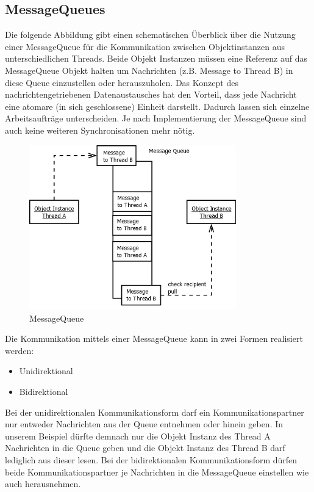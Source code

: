 \documentclass[12pt,oneside,a4paper,bibtotoc,liststotoc]{scrreprt}
\begin{document}
\subsection{MessageQueues}
Die folgende Abbildung gibt einen schematischen Überblick über die Nutzung einer MessageQueue für die Kommunikation zwischen Objektinstanzen aus unterschiedlichen Threads. Beide Objekt Instanzen müssen eine Referenz auf das MessageQueue Objekt halten um Nachrichten (z.B. Message to Thread B) in diese Queue einzustellen oder herauszuholen. Das Konzept des nachrichtengetriebenen Datenaustausches hat den Vorteil, dass jede Nachricht eine atomare (in sich geschlossene) Einheit darstellt. Dadurch lassen sich einzelne Arbeitsaufträge unterscheiden. Je nach Implementierung der MessageQueue sind auch keine weiteren Synchronisationen mehr nötig.
\begin{figure}[H]
  \begin{centering}
    \includegraphics[width=0.8\textwidth]{img/MessageQueue.png}
    \caption{MessageQueue}
    \label{MessageQueue}
  \end{centering}
\end{figure}
Die Kommunikation mittels einer MessageQueue kann in zwei Formen realisiert werden:
\begin{itemize}
\item Unidirektional
\item Bidirektional
\end{itemize}
Bei der unidirektionalen Kommunikationsform darf ein Kommunikationspartner nur entweder Nachrichten aus der Queue entnehmen oder hinein geben. In unserem Beispiel dürfte demnach nur die Objekt Instanz des Thread A Nachrichten in die Queue geben und die Objekt Instanz des Thread B darf lediglich aus dieser lesen.\newline
Bei der bidirektionalen Kommunikationsform dürfen beide Kommunikationspartner je Nachrichten in die MessageQueue einstellen wie auch herausnehmen.\newline 
\newline
\end{document}
